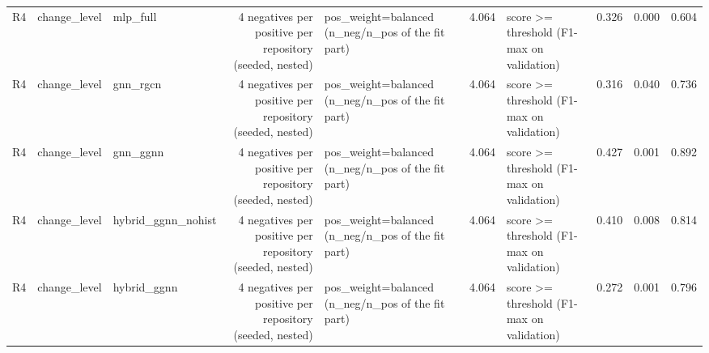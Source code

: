 \begin{table}[htbp]
{\begin{tabular}{lllrlrlrrr}
R4 & change\_level & mlp\_full & 4 negatives per positive per repository (seeded, nested) & pos\_weight=balanced (n\_neg/n\_pos of the fit part) & 4.064 & score >= threshold (F1-max on validation) & 0.326 & 0.000 & 0.604 \\
R4 & change\_level & gnn\_rgcn & 4 negatives per positive per repository (seeded, nested) & pos\_weight=balanced (n\_neg/n\_pos of the fit part) & 4.064 & score >= threshold (F1-max on validation) & 0.316 & 0.040 & 0.736 \\
R4 & change\_level & gnn\_ggnn & 4 negatives per positive per repository (seeded, nested) & pos\_weight=balanced (n\_neg/n\_pos of the fit part) & 4.064 & score >= threshold (F1-max on validation) & 0.427 & 0.001 & 0.892 \\
R4 & change\_level & hybrid\_ggnn\_nohist & 4 negatives per positive per repository (seeded, nested) & pos\_weight=balanced (n\_neg/n\_pos of the fit part) & 4.064 & score >= threshold (F1-max on validation) & 0.410 & 0.008 & 0.814 \\
R4 & change\_level & hybrid\_ggnn & 4 negatives per positive per repository (seeded, nested) & pos\_weight=balanced (n\_neg/n\_pos of the fit part) & 4.064 & score >= threshold (F1-max on validation) & 0.272 & 0.001 & 0.796 \\
\bottomrule
\end{tabular}}
\end{table}
